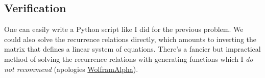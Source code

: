 \documentclass[11pt]{article}
\begin{document}
\subsection{Verification}
One can easily write a Python script like I did for the previous problem. We could also solve the recurrence relations directly, which amounts to inverting the matrix that defines a linear system of equations. There's a fancier but impractical method of solving the recurrence relations with generating functions \cite{wilf2014generatingfunctionology} which I \emph{do not recommend} (apologies \href{https://www.wolframalpha.com/input?i=3rd+derivative+of+1%2F6+*+%28-3%28-1538x%2F255%2Bx%5E2+%2B+x%5E3+%2B+x%5E4%2Bx%5E5%2Bx%5E6%2Bx%5E7%2Bx%5E8-247x%5E9%2F255%29%2F%28x%5E2-3x%2B2%29%29+evaluated+at+x+%3D+0}{WolframAlpha}).

\newpage
\printbibliography
\end{document}
